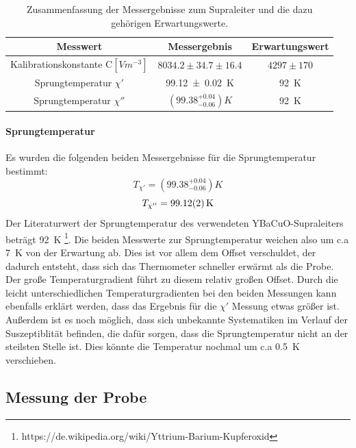 \documentclass[12pt,a4paper]{article}
\begin{document}
\begin{table}
\centering
\begin{tabular}{|c|c|c|}
\hline 
Messwert & Messergebnis & Erwartungswert \\
\hline 
Kalibrationskonstante C$[\si{Vm^{-3}}]$& $8034.2\pm 34.7\pm 16.4$ & $4297\pm 170$ \\ 
\hline 
Sprungtemperatur $\chi'$ & \SI{99.12\pm 0.02}{K} & \SI{92}{K} \\ 
\hline 
Sprungtemperatur $\chi''$ & $(99.38^{+0.04}_{-0.06}) \si{K}$ & \SI{92}{K} \\ 
\hline 
\end{tabular} 
\caption{Zusammenfassung der Messergebnisse zum Supraleiter und die dazu gehörigen Erwartungswerte.}
\label{tab:supra_ergebnis}
\end{table}

\paragraph{Sprungtemperatur}
Es wurden die folgenden beiden Messergebnisse für die Sprungtemperatur bestimmt:
\begin{equation*}
T_{\chi'} = (99.38^{+0.04}_{-0.06}) \si{K}
\end{equation*}
\begin{equation*}
T_{\chi''} = \SI{99.12\pm 0.02}{K}
\end{equation*}
Der Literaturwert der Sprungtemperatur des verwendeten YBaCuO-Supraleiters beträgt \SI{92}{K} \footnote{https://de.wikipedia.org/wiki/Yttrium-Barium-Kupferoxid}. Die beiden Messwerte zur Sprungtemperatur weichen also um c.a \SI{7}{K} von der Erwartung ab. Dies ist vor allem dem Offset verschuldet, der dadurch entsteht, dass sich das Thermometer schneller erwärmt als die Probe. Der große Temperaturgradient führt zu diesem relativ großen Offset. Durch die leicht unterschiedlichen Temperaturgradienten bei den beiden Messungen kann ebenfalls erklärt werden, dass das Ergebnis für die $\chi'$ Messung etwas größer ist. Außerdem ist es noch möglich, dass sich unbekannte Systematiken im Verlauf der Suszeptiblität befinden, die dafür sorgen, dass die Sprungtemperatur nicht an der steilsten Stelle ist. Dies könnte die Temperatur nochmal um c.a \SI{0,5}{K} verschieben.

\newpage
\subsection{Messung der Probe}
\end{document}
